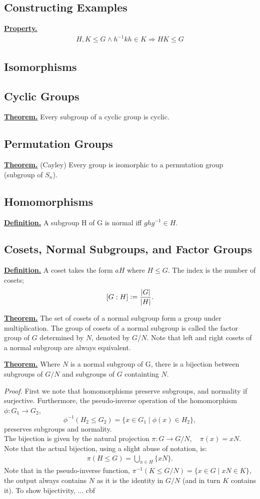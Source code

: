 \documentclass{article}
\renewcommand\({\left(}
\renewcommand\){\right)}
\begin{document}
\subsection{Constructing Examples}
\underline{\textbf{Property.}} 
\begin{align*}
    H, K\leq G\land h^{-1}kh\in K\Rightarrow HK\leq G
\end{align*}
\subsection{Isomorphisms}
\subsection{Cyclic Groups}
\underline{\textbf{Theorem.}} Every subgroup of a cyclic group is cyclic.
\subsection{Permutation Groups}
\underline{\textbf{Theorem.}} (Cayley) Every group is isomorphic to a permutation group (subgroup of $S_n$).
\subsection{Homomorphisms}
\underline{\textbf{Definition.}} A subgroup H of G is normal iff $ghg^{-1}\in H$.
\subsection{Cosets, Normal Subgroups, and Factor Groups}
\underline{\textbf{Definition.}} A coset takes the form $aH$ where $H\leq G$. The index is the number of cosets; \[[G:H]\vcentcolon=\frac{|G|}{|H|}.\] 

\vspace{6mm}
\underline{\textbf{Theorem.}} The set of cosets of a normal subgroup form a group under multiplication. The group of cosets of a normal subgroup is called the factor group of $G$ determined by $N$, denoted by $G/N$. Note that left and right cosets of a normal subgroup are always equivalent.

\vspace{6mm}
\underline{\textbf{Theorem.}} Where $N$ is a normal subgroup of G, there is a bijection between subgroups of $G/N$ and subgroups of $G$ containting $N$. 

\vspace{3mm}
\emph{Proof.} First we note that homomorphisms preserve subgroups, and normality if surjective. Furthermore, the pseudo-inverse operation of the homomorphism $\phi: G_1\rightarrow G_2$, \[\phi^{-1}(H_2\leq G_2)=\{x\in G_1\mid \phi(x)\in H_2\},\] preserves subgroups and normality.\\
The bijection is given by the natural projection $\pi: G\rightarrow G/N,\quad \pi(x)=xN$. Note that the actual bijection, using a slight abuse of notation, is: 
\begin{align*}
    \pi(H\leq G)=\bigcup_{x\in H} \{xN\}.
\end{align*}
Note that in the pseudo-inverse function, $\pi^{-1}(K\leq G/N)=\{x\in G\mid xN\in K\}$, the output always contains $N$ as it is the identity in $G/N$ (and in turn $K$ contains it). To show bijectivity, ... cbf
\end{document}
